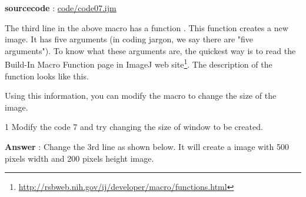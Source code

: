 \textbf{sourcecode} : \href{http://www.example.com/contents}{code/code07.ijm}

The third line in the above macro has a function . This
function creates a new image. It has five arguments (in coding jargon, we say
there are "five arguments"). To know what these arguments are, 
the quickest way is to read the Build-In Macro Function page in ImageJ web site\footnote{\url{http://rsbweb.nih.gov/ij/developer/macro/functions.html}}.  
The description of the function  looks like this.

\begin{indentCom}


\end{indentCom}
Using this information, you can modify the macro to change the size of the image.

\begin{indentexercise}
{1}
Modify the code 7 and try changing the size of window to be created.

\item \textbf{Answer} : Change the 3rd line as shown below. It will create a image with 500 pixels width and 200 pixels height image.
\end{indentexercise}
